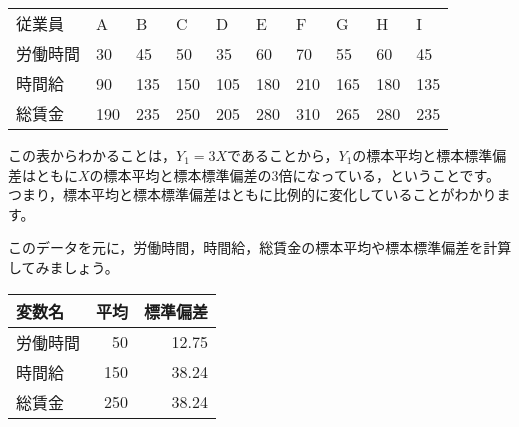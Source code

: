 \documentclass[
  letterpaper,
  pandoc,
  ja=standard,
  jafont = hiragino-pron]{ltjsbook}
\newenvironment{Shaded}{\begin{snugshade}}{\end{snugshade}}
\newcommand{\AttributeTok}[1]{\textcolor[rgb]{0.40,0.45,0.13}{#1}}
\newcommand{\ConstantTok}[1]{\textcolor[rgb]{0.56,0.35,0.01}{#1}}
\newcommand{\DecValTok}[1]{\textcolor[rgb]{0.68,0.00,0.00}{#1}}
\newcommand{\FunctionTok}[1]{\textcolor[rgb]{0.28,0.35,0.67}{#1}}
\newcommand{\NormalTok}[1]{\textcolor[rgb]{0.00,0.23,0.31}{#1}}
\newcommand{\OtherTok}[1]{\textcolor[rgb]{0.00,0.23,0.31}{#1}}
\newcommand{\SpecialCharTok}[1]{\textcolor[rgb]{0.37,0.37,0.37}{#1}}
\newcommand{\StringTok}[1]{\textcolor[rgb]{0.13,0.47,0.30}{#1}}
\begin{document}
\begin{longtable}[]{@{}llllllllll@{}}
\toprule\noalign{}
\endhead
\bottomrule\noalign{}
\endlastfoot
従業員 & A & B & C & D & E & F & G & H & I \\
労働時間 & 30 & 45 & 50 & 35 & 60 & 70 & 55 & 60 & 45 \\
時間給 & 90 & 135 & 150 & 105 & 180 & 210 & 165 & 180 & 135 \\
総賃金 & 190 & 235 & 250 & 205 & 280 & 310 & 265 & 280 & 235 \\
\end{longtable}

この表からわかることは，\(Y_1=3X\)であることから，\(Y_1\)の標本平均と標本標準偏差はともに\(X\)の標本平均と標本標準偏差の3倍になっている，ということです。
つまり，標本平均と標本標準偏差はともに比例的に変化していることがわかります。

このデータを元に，労働時間，時間給，総賃金の標本平均や標本標準偏差を計算してみましょう。

\begin{Shaded}
\end{Shaded}

\begin{longtable}[]{@{}lrr@{}}
\toprule\noalign{}
変数名 & 平均 & 標準偏差 \\
\midrule\noalign{}
\endhead
\bottomrule\noalign{}
\endlastfoot
労働時間 & 50 & 12.75 \\
時間給 & 150 & 38.24 \\
総賃金 & 250 & 38.24 \\
\end{longtable}
\end{document}
